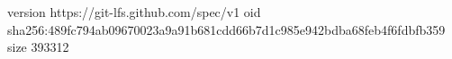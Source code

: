 version https://git-lfs.github.com/spec/v1
oid sha256:489fc794ab09670023a9a91b681cdd66b7d1c985e942bdba68feb4f6fdbfb359
size 393312
